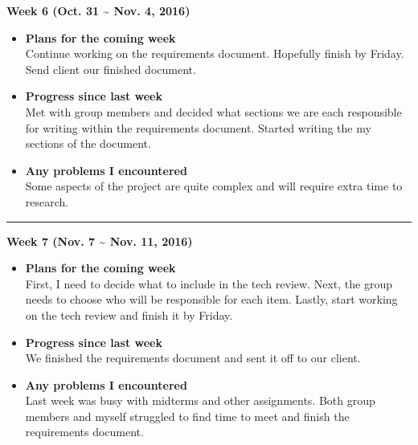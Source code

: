 		\newpage

		\begin{center}
			\textbf{Week 6 (Oct. 31 {\textasciitilde{}} Nov. 4, 2016)}
		\end{center}
		\begin{itemize}
			\item \textbf{Plans for the coming week}
			\\ Continue working on the requirements document. Hopefully finish by Friday. Send client our finished document.\\

			\item \textbf{Progress since last week}
			\\Met with group members and decided what sections we are each responsible for writing within the requirements document. Started writing the my sections of the document.\\

			\item \textbf{Any problems I encountered}
			\\Some aspects of the project are quite complex and will require extra time to research.\\
		\end{itemize}

		\rule{\textwidth}{0.5pt}

		\begin{center}
			\textbf{Week 7 (Nov. 7 {\textasciitilde{}} Nov. 11, 2016)}
		\end{center}
		\begin{itemize}
			\item \textbf{Plans for the coming week}
			\\ First, I need to decide what to include in the tech review. Next, the group needs to choose who will be responsible for each item. Lastly, start working on the tech review and finish it by Friday.\\

			\item \textbf{Progress since last week}
			\\We finished the requirements document and sent it off to our client.\\

			\item \textbf{Any problems I encountered}
			\\Last week was busy with midterms and other assignments. Both group members and myself struggled to find time to meet and finish the requirements document.\\
		\end{itemize}


